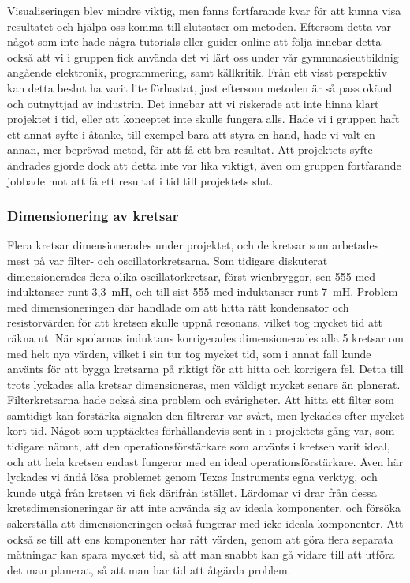 \documentclass[a4paper]{article}
\makeatletter
\let\\\@raggedtwoe@savedcr%
\makeatother
\begin{document}
\begin{sloppypar}
    Visualiseringen blev mindre viktig, men fanns fortfarande kvar för att kunna visa resultatet och hjälpa oss komma till slutsatser om metoden.
    Eftersom detta var något som inte hade några tutorials eller guider online att följa innebar detta också att vi i gruppen fick använda det vi lärt oss under vår gymmnasieutbildnig angående elektronik, programmering, samt källkritik.
    Från ett visst perspektiv kan detta beslut ha varit lite förhastat, just eftersom metoden är så pass okänd och outnyttjad av industrin. Det innebar att vi riskerade att inte hinna klart projektet i tid, eller att konceptet inte skulle fungera alls.
    Hade vi i gruppen haft ett annat syfte i åtanke, till exempel bara att styra en hand, hade vi valt en annan, mer beprövad metod, för att få ett bra resultat.
    Att projektets syfte ändrades gjorde dock att detta inte var lika viktigt, även om gruppen fortfarande jobbade mot att få ett resultat i tid till projektets slut.

    \subsubsection{Dimensionering av kretsar}
    Flera kretsar dimensionerades under projektet, och de kretsar som arbetades mest på var filter- och oscillatorkretsarna.
    Som tidigare diskuterat dimensionerades flera olika oscillatorkretsar, först wienbryggor, sen 555 med induktanser runt 3,3~mH, och till sist 555 med induktanser runt 7~mH.
    Problem med dimensioneringen där handlade om att hitta rätt kondensator och resistorvärden för att kretsen skulle uppnå resonans, vilket tog mycket tid att räkna ut.
    När spolarnas induktans korrigerades dimensionerades alla 5 kretsar om med helt nya värden, vilket i sin tur tog mycket tid, som i annat fall kunde använts för att bygga kretsarna på riktigt för att hitta och korrigera fel.
    Detta till trots lyckades alla kretsar dimensioneras, men väldigt mycket senare än planerat.
    \\\\
    Filterkretsarna hade också sina problem och svårigheter. Att hitta ett filter som samtidigt kan förstärka signalen den filtrerar var svårt, men lyckades efter mycket kort tid. Något som upptäcktes förhållandevis sent in i projektets gång var, som tidigare nämnt, att den operationsförstärkare som använts i kretsen varit ideal, och att hela kretsen endast fungerar med en ideal operationsförstärkare.
    Även här lyckades vi ändå lösa problemet genom Texas Instruments egna verktyg, och kunde utgå från kretsen vi fick därifrån istället.
    \\\\
    Lärdomar vi drar från dessa kretsdimensioneringar är att inte använda sig av ideala komponenter, och försöka säkerställa att dimensioneringen också fungerar med icke-ideala komponenter. Att också se till att ens komponenter har rätt värden, genom att göra flera separata mätningar kan spara mycket tid, så att man snabbt kan gå vidare till att utföra det man planerat, så att man har tid att åtgärda problem.


\end{sloppypar}
\end{document}
